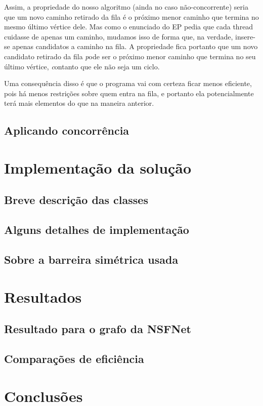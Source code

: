 \documentclass[a4paper,11pt]{article}
\begin{document}
    Assim, a propriedade do nosso algoritmo (ainda no caso não-concorrente)
    seria que um novo caminho retirado da fila é o próximo menor caminho que
    termina no mesmo último vértice dele. Mas como o enunciado do EP pedia que
    cada thread cuidasse de apenas um caminho, mudamos isso de forma que, na
    verdade, insere-se apenas candidatos a caminho na fila. A propriedade fica
    portanto que um novo candidato retirado da fila {\textit pode} ser o próximo
    menor caminho que termina no seu último vértice, {\textit contanto que ele
    não seja um ciclo}.

    Uma consequência disso é que o programa vai com certeza ficar menos
    eficiente, pois há menos restrições sobre quem entra na fila, e portanto ela
    potencialmente terá mais elementos do que na maneira anterior.

  \subsection{Aplicando concorrência}

\section{Implementação da solução}

  \subsection{Breve descrição das classes}

  \subsection{Alguns detalhes de implementação}

  \subsection{Sobre a barreira simétrica usada}

\section{Resultados}

  \subsection{Resultado para o grafo da NSFNet}

  \subsection{Comparações de eficiência}

\section{Conclusões}
\end{document}
